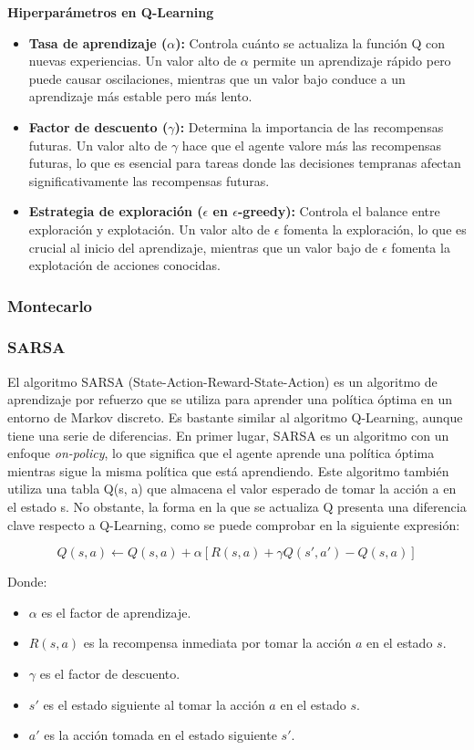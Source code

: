 \documentclass[conference,a4paper]{IEEEtran}
\begin{document}
\textbf{Hiperparámetros en Q-Learning}
\begin{itemize}
  \item \textbf{Tasa de aprendizaje (\(\alpha\)):} Controla cuánto se actualiza la función Q con nuevas experiencias. Un valor alto de \(\alpha\) permite un aprendizaje rápido pero puede causar oscilaciones, mientras que un valor bajo conduce a un aprendizaje más estable pero más lento.
  \item \textbf{Factor de descuento (\(\gamma\)):} Determina la importancia de las recompensas futuras. Un valor alto de \(\gamma\) hace que el agente valore más las recompensas futuras, lo que es esencial para tareas donde las decisiones tempranas afectan significativamente las recompensas futuras.
  \item \textbf{Estrategia de exploración (\(\epsilon\) en \(\epsilon\)-greedy):} Controla el balance entre exploración y explotación. Un valor alto de \(\epsilon\) fomenta la exploración, lo que es crucial al inicio del aprendizaje, mientras que un valor bajo de \(\epsilon\) fomenta la explotación de acciones conocidas.\newline
\end{itemize}


\subsubsection{\textbf{Montecarlo}}

\subsubsection{\textbf{SARSA}}
El algoritmo SARSA (State-Action-Reward-State-Action) es un algoritmo de aprendizaje por refuerzo que se utiliza para aprender una política óptima en un entorno de Markov discreto. Es bastante similar al algoritmo Q-Learning, 
aunque tiene una serie de diferencias. En primer lugar, SARSA es un algoritmo con un enfoque \textit{on-policy}, lo que significa 
que el agente aprende una política óptima mientras sigue la misma política que está aprendiendo. Este algoritmo también utiliza una tabla Q(s, a) que almacena el valor esperado de tomar la acción a en el estado s. No obstante, 
la forma en la que se actualiza Q presenta una diferencia clave respecto a Q-Learning, como se puede comprobar en la siguiente expresión:

\[
Q(s, a) \leftarrow Q(s, a) + \alpha [R(s, a) + \gamma Q(s', a') - Q(s, a)]
\]

Donde:
\begin{itemize}
    \item \(\alpha\) es el factor de aprendizaje.
    \item \(R(s, a)\) es la recompensa inmediata por tomar la acción \(a\) en el estado \(s\).
    \item \(\gamma\) es el factor de descuento.
    \item \(s'\) es el estado siguiente al tomar la acción \(a\) en el estado \(s\).
    \item \(a'\) es la acción tomada en el estado siguiente \(s'\).\newline
\end{itemize}
\end{document}
